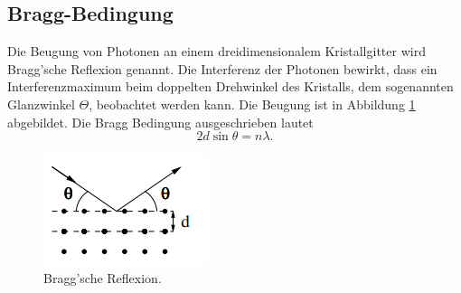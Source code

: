 \subsection{Bragg-Bedingung}
Die Beugung von Photonen an einem dreidimensionalem Kristallgitter wird Bragg'sche Reflexion genannt.
Die Interferenz der Photonen bewirkt, dass ein Interferenzmaximum beim doppelten Drehwinkel des Kristalls, dem sogenannten Glanzwinkel $\Theta$, beobachtet werden kann.
Die Beugung ist in Abbildung \ref{fig:Bragg} abgebildet.
Die Bragg Bedingung ausgeschrieben lautet
\begin{equation}
    2d \sin\theta=n\lambda.
\end{equation}
\begin{figure}[H]
    \centering
    \includegraphics[scale=1.5]{content/Bragg.png}
    \caption{Bragg'sche Reflexion\cite{sample}.}
    \label{fig:Bragg}
\end{figure}

\cite{sample}
